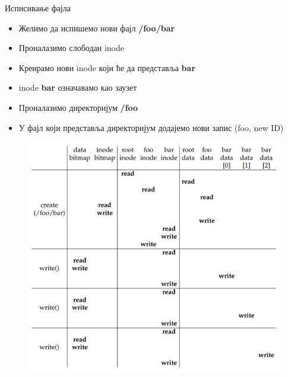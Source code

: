 \documentclass[xcolor=table]{beamer}
\begin{document}
    \begin{frame}[allowframebreaks]{Исписивање фајла}
        \begin{itemize}
            \item Желимо да испишемо нови фајл \textbf{/foo/bar}
            \item Проналазимо слободан inode
            \item Креирамо нови inode који ће да представља \textbf{bar}
            \item inode \textbf{bar} означавамо као заузет
            \item Проналазимо директоријум \textbf{/foo}
            \item У фајл који представља директоријум додајемо нови запис (foo, new ID)
        \end{itemize}
        
        \framebreak
        
        \begin{figure}
            \centering
            \includegraphics[width=\textwidth,height=0.8\textheight,keepaspectratio]{images/write.png}
            \label{fig:write.png}
        \end{figure}
    \end{frame}
    
\end{document}
